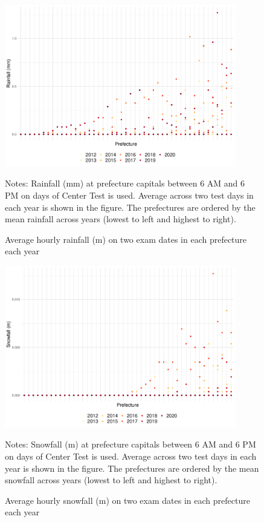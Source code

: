 \documentclass[12pt,letterpaper]{article}
\begin{document}
\begin{figure}[H]
  \centering
  \caption{Average hourly rainfall (m) on two exam dates in each prefecture each year}
  \includegraphics[width = 0.9\textwidth]{../Output/images/rainfall_diff.pdf}
  \label{fig:rainfall_diff}
  \footnotesize
  \begin{tablenotes}
    \item Notes:
      Rainfall (mm) at prefecture capitals between 6 AM and 6 PM on days of Center Test is used.
      Average across two test days in each year is shown in the figure.
      The prefectures are ordered by the mean rainfall across years (lowest to left and highest to right).
  \end{tablenotes}
\end{figure}

\begin{figure}[H]
  \centering
  \caption{Average hourly snowfall (m) on two exam dates in each prefecture each year}
  \includegraphics[width = 0.9\textwidth]{../Output/images/snowfall_diff.pdf}
  \label{fig:snowfall_diff}
  \footnotesize
  \begin{tablenotes}
    \item Notes:
      Snowfall (m) at prefecture capitals between 6 AM and 6 PM on days of Center Test is used.
      Average across two test days in each year is shown in the figure.
      The prefectures are ordered by the mean snowfall across years (lowest to left and highest to right).
  \end{tablenotes}
\end{figure}
\end{document}
